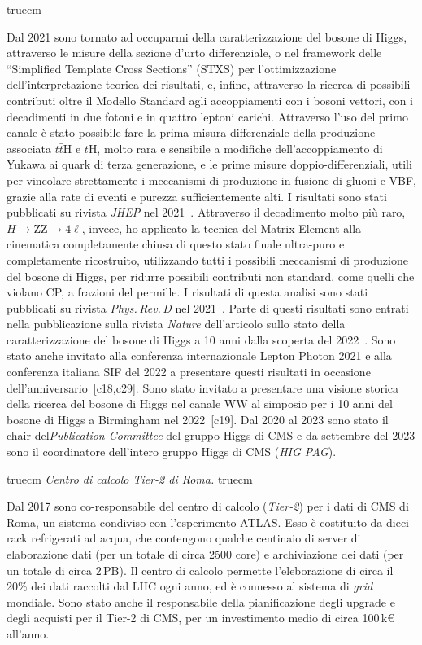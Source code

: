 \documentclass[11pt,twoside,a4paper]{article}
\begin{document}
 truecm

Dal 2021 sono tornato ad occuparmi della caratterizzazione del bosone
di Higgs, attraverso le misure della sezione d'urto differenziale, o
nel framework delle ``Simplified Template Cross Sections'' (STXS) per
l'ottimizzazione dell'interpretazione teorica dei risultati, e,
infine, attraverso la ricerca di possibili contributi oltre il Modello
Standard agli accoppiamenti con i bosoni vettori, con i decadimenti in
due fotoni e in quattro leptoni carichi. Attraverso l'uso del primo
canale \`e stato possibile fare la prima misura differenziale della
produzione associata $t\bar t$H e $t$H, molto rara e sensibile a
modifiche dell'accoppiamento di Yukawa ai quark di terza generazione,
e le prime misure doppio-differenziali, utili per vincolare
strettamente i meccanismi di produzione in fusione di gluoni e VBF,
grazie alla rate di eventi e purezza sufficientemente alti.  I
risultati sono stati pubblicati su rivista \textit{JHEP} nel
2021~\cite{CMS:2021kom}.  Attraverso il decadimento molto pi\`u raro,
$H\to$ZZ$\to 4\ell$, invece, ho applicato la tecnica del Matrix
Element alla cinematica completamente chiusa di questo stato finale
ultra-puro e completamente ricostruito, utilizzando tutti i possibili
meccanismi di produzione del bosone di Higgs, per ridurre possibili
contributi non standard, come quelli che violano CP, a frazioni del
permille. I risultati di questa analisi sono stati pubblicati su
rivista \textit{Phys.\,Rev.\,D} nel 2021~\cite{CMS:2021nnc}.  Parte di
questi risultati sono entrati nella pubblicazione sulla rivista
\textit{Nature} dell'articolo sullo stato della caratterizzazione del
bosone di Higgs a 10 anni dalla scoperta del 2022~\cite{CMS:2022dwd}. Sono stato anche
invitato alla conferenza internazionale Lepton Photon 2021 e alla
conferenza italiana SIF del 2022 a presentare questi risultati in
occasione dell'anniversario~[c18,c29]. Sono stato invitato a
presentare una visione storica della ricerca del bosone di Higgs nel
canale WW al simposio per i 10 anni del bosone di Higgs a Birmingham
nel 2022~[c19]. Dal 2020 al 2023 sono stato il chair
del\textit{Publication Committee} del gruppo Higgs di CMS e da
settembre del 2023 sono il coordinatore dell'intero gruppo Higgs di
CMS (\textit{HIG PAG}).




 truecm
\textit{Centro di calcolo Tier-2 di Roma.}
 truecm

Dal 2017 sono co-responsabile del centro di calcolo (\textit{Tier-2})
per i dati di CMS di Roma, un sistema condiviso con l'esperimento
ATLAS. Esso \`e costituito da dieci rack refrigerati ad acqua, che
contengono qualche centinaio di server di elaborazione dati (per un
totale di circa 2500 core) e archiviazione dei dati (per un totale di
circa 2\,PB). Il centro di calcolo permette l'eleborazione di circa il
20\% dei dati raccolti dal LHC ogni anno, ed \`e connesso al sistema
di \textit{grid} mondiale. Sono stato anche il responsabile della
pianificazione degli upgrade e degli acquisti per il Tier-2 di CMS,
per un investimento medio di circa 100\,k\euro{} all'anno.
\end{document}
